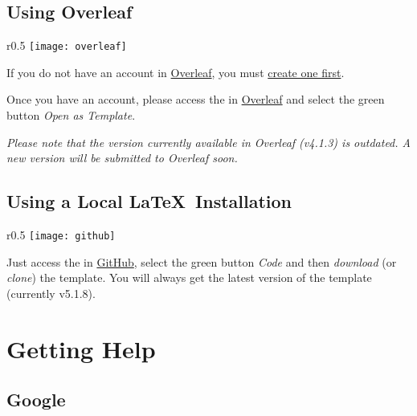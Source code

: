 \subsection{Using Overleaf}
\label{sub:using_overleaf}

\begin{wrapfigure}{r}{0.5\linewidth}
\vspace*{-15ex}\texttt{[image: overleaf]}%
\end{wrapfigure}

If you do not have an account in \href{https://www.overleaf.com?r=f5160636&rm=d&rs=b}{Overleaf}, you must \href{https://www.overleaf.com?r=f5160636&rm=d&rs=b}{create one first}.

Once you have an account, please access the  in \href{https://www.overleaf.com/latex/templates/new-university-of-lisbon-universidade-nova-de-lisboa-slash-unl-thesis-template/fwbztcrptjmg}{Overleaf} and select the green button \emph{Open as Template}. 

\emph{Please note that the version currently available in Overleaf (v4.1.3) is outdated. A new version will be submitted to Overleaf soon.}  

\subsection{Using a Local \LaTeX\ Installation}
\label{sub:using_local_latex}

\begin{wrapfigure}{r}{0.5\linewidth}
\vspace*{-15ex}\texttt{[image: github]}%
\end{wrapfigure}

Just access the  in \href{https://github.com/joaomlourenco/novathesis}{GitHub}, select the green button \emph{Code} and then \emph{download} (or \emph{clone}) the template.  You will always get the latest version of the template (currently v5.1.8).


\section{Getting Help}
\label{sec:getting_help}

\begin{center}  
\end{center}
 
\subsection{Google}
\label{sub:group_google}

